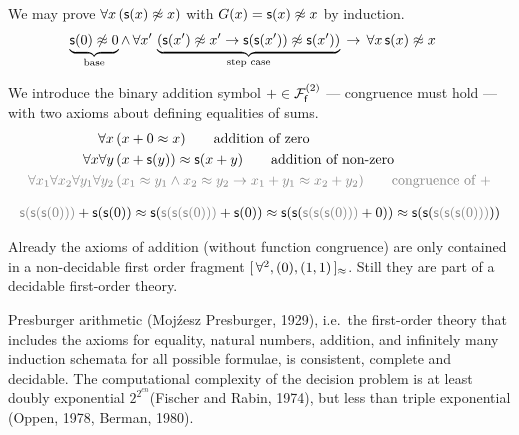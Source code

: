 \begin{example}
	We may prove \( \forall x\, (\msucc(x) \mNE x) \) with \( G(x) = \msucc(x) \mNE x \) by induction.
	\begin{align*}
		\underbrace{\msucc(0)\mNE 0}_{\text{base}}
		\land \, \forall x' \, &
		\underbrace{
			\left( \msucc(x')\mNE x' \limp \msucc(\msucc(x'))\mNE \msucc(x') \right)
		}_{\text{step case}}
		\, \limp \, \forall x \, \msucc(x)\mNE x
		\end{align*}
\end{example}

\begin{definition}
	[Addition]\label{def:addition:axioms}
	We introduce the binary addition symbol \( +\in\mcFfn[2] \)
	--- congruence must hold ---
	with two axioms about defining equalities of sums.
\begin{align*}
\forall x\,
&(x+0 \mEQ x)
\tag*{addition of zero}\\
\forall x\forall y\,
&(x+\msucc(y)) \mEQ \msucc(x+y)
\tag*{addition of non-zero}
\\
\colG\forall x_1\forall x_2\forall y_1\forall y_2\,
&\colG (x_1\mEQ y_1\land x_2\mEQ y_2 \limp x_1+y_1\mEQ x_2+y_2)
\tag*{congruence of \( + \)}
\end{align*}
\end{definition}

\begin{example}
	\begin{gather*}
	{\colG \msucc(\msucc(\msucc(0)))} + \msucc(\msucc(0))
	\mEQ\msucc({\colG \msucc(\msucc(\msucc(0)))} + \msucc(0))
	\mEQ \msucc(\msucc(
	{\colG \msucc(\msucc(\msucc(0)))} + 0))
	\mEQ \msucc(\msucc(
	{\colG \msucc(\msucc(\msucc(0)))}))
	\end{gather*}
\end{example}

\begin{remark}
	Already the axioms of addition (without function congruence)
	are only contained in a non-decidable first order fragment
	\( [ \, \forall^2 , (0), (1,1) \, ]{}_{\mEQ} \).
	Still they are part of a decidable first-order theory.
\end{remark}

\begin{theorem}Presburger arithmetic (Moj\'{z}esz Presburger, 1929), i.e.\ the first-order theory that includes the axioms for equality, natural numbers, addition, and 
	infinitely many induction schemata for all possible formulae, is consistent, complete and decidable. The computational complexity of the decision problem is at least doubly exponential \( 2^{2^{cn}} \)(Fischer and Rabin, 1974), but less than triple exponential (Oppen, 1978, Berman, 1980).
\end{theorem}

